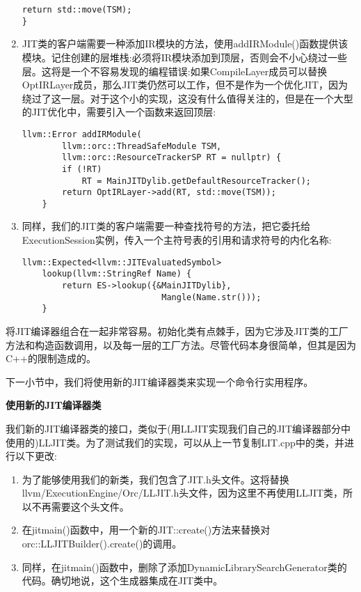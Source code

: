 \begin{enumerate}
\begin{lstlisting}[caption={}]
	return std::move(TSM);
}
\end{lstlisting}

\item JIT类的客户端需要一种添加IR模块的方法，使用addIRModule()函数提供该模块。记住创建的层堆栈:必须将IR模块添加到顶层，否则会不小心绕过一些层。这将是一个不容易发现的编程错误:如果CompileLayer成员可以替换OptIRLayer成员，那么JIT类仍然可以工作，但不是作为一个优化JIT，因为绕过了这一层。对于这个小的实现，这没有什么值得关注的，但是在一个大型的JIT优化中，需要引入一个函数来返回顶层:
\begin{lstlisting}[caption={}]
	llvm::Error addIRModule(
		llvm::orc::ThreadSafeModule TSM,
		llvm::orc::ResourceTrackerSP RT = nullptr) {
		if (!RT)
			RT = MainJITDylib.getDefaultResourceTracker();
		return OptIRLayer->add(RT, std::move(TSM));
	}
\end{lstlisting}

\item 同样，我们的JIT类的客户端需要一种查找符号的方法，把它委托给ExecutionSession实例，传入一个主符号表的引用和请求符号的内化名称:
\begin{lstlisting}[caption={}]
	llvm::Expected<llvm::JITEvaluatedSymbol>
	lookup(llvm::StringRef Name) {
		return ES->lookup({&MainJITDylib},
							Mangle(Name.str()));
	}
\end{lstlisting}

\end{enumerate}

将JIT编译器组合在一起非常容易。初始化类有点棘手，因为它涉及JIT类的工厂方法和构造函数调用，以及每一层的工厂方法。尽管代码本身很简单，但其是因为C++的限制造成的。\par

下一小节中，我们将使用新的JIT编译器类来实现一个命令行实用程序。\par

\hspace*{\fill} \par %
\textbf{使用新的JIT编译器类}

我们新的JIT编译器类的接口，类似于(用LLJIT实现我们自己的JIT编译器部分中使用的)LLJIT类。为了测试我们的实现，可以从上一节复制LIT.cpp中的类，并进行以下更改:\par

\begin{enumerate}
\item 为了能够使用我们的新类，我们包含了JIT.h头文件。这将替换llvm/ExecutionEngine/Orc/LLJIT.h头文件，因为这里不再使用LLJIT类，所以不再需要这个头文件。

\item 在jitmain()函数中，用一个新的JIT::create()方法来替换对orc::LLJITBuilder().create()的调用。

\item 同样，在jitmain()函数中，删除了添加DynamicLibrarySearchGenerator类的代码。确切地说，这个生成器集成在JIT类中。
\end{enumerate}

